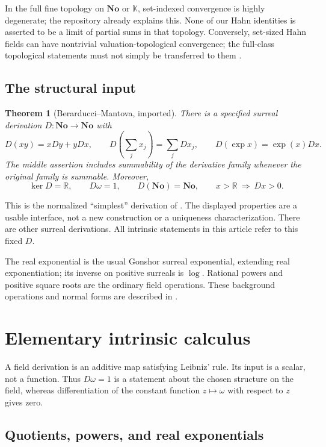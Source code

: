 \documentclass[11pt,a4paper]{article}
\numberwithin{equation}{section}
\newtheorem{theorem}{Theorem}[section]
\theoremstyle{definition}
\theoremstyle{remark}
\newcommand{\No}{\mathbf{No}}
\newcommand{\K}{\mathbb K}
\newcommand{\R}{\mathbb R}
\begin{document}
In the full fine topology on $\No$ or $\K$, set-indexed convergence is highly
degenerate; the repository already explains this. None of our Hahn identities
is asserted to be a limit of partial sums in that topology. Conversely,
set-sized Hahn fields can have nontrivial valuation-topological convergence;
the full-class topological statements must not simply be transferred to
them \cite{RepoAnalysis,RepoFound}.

\subsection{The structural input}

\begin{theorem}[Berarducci--Mantova, imported]\label{thm:BM}
There is a specified surreal derivation $D:\No\to\No$ with
\[
 D(xy)=xDy+yDx,\qquad
 D\!\left(\sum_jx_j\right)=\sum_jDx_j,
 \qquad D(\exp x)=\exp(x)Dx.
\]
The middle assertion includes summability of the derivative family whenever
the original family is summable. Moreover,
\[
 \ker D=\R,\qquad D\omega=1,\qquad D(\No)=\No,
 \qquad x>\R\ \Longrightarrow\ Dx>0.
\]
\end{theorem}

This is the normalized ``simplest'' derivation of
\cite[Theorems 6.30 and 7.7]{BM}. The displayed properties are a usable
interface, not a new construction or a uniqueness characterization. There
are other surreal derivations. All intrinsic statements in this article
refer to this fixed $D$.

The real exponential is the usual Gonshor surreal exponential, extending
real exponentiation; its inverse on positive surreals is $\log$. Rational
powers and positive square roots are the ordinary field operations. These
background operations and normal forms are described in \cite{Gonshor}.

\section{Elementary intrinsic calculus}
\label{sec:real-calculus}

A field derivation is an additive map satisfying Leibniz' rule. Its input
is a scalar, not a function. Thus $D\omega=1$ is a statement about the chosen
structure on the field, whereas differentiation of the constant function
$z\mapsto\omega$ with respect to $z$ gives zero.

\subsection{Quotients, powers, and real exponentials}
\end{document}
